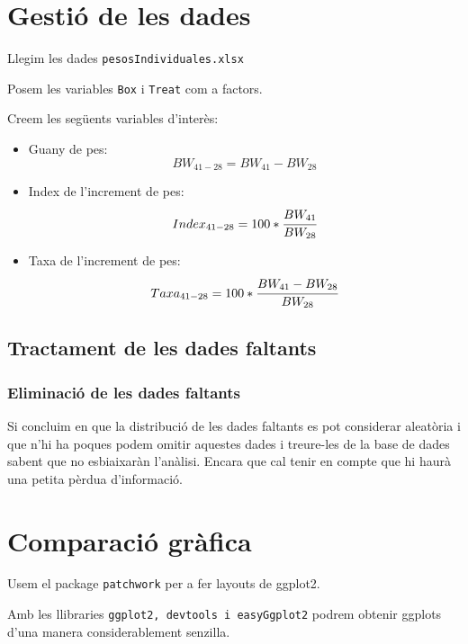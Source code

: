 \documentclass[11pt,a4paper]{article}\usepackage[]{graphicx}\usepackage[]{color}
\begin{document}
\section{Gestió de les dades}
Llegim les dades \texttt{pesosIndividuales.xlsx}





Posem les variables \texttt{Box} i \texttt{Treat} com a factors.



Creem les següents variables d'interès:
\begin{itemize}
\item Guany de pes: 
$$BW_{41-28} = BW_{41} - BW_{28}$$

\item Index de l'increment de pes:
$$Index_{41-28} = 100*\cfrac{BW_{41}}{BW_{28}}$$

\item Taxa de l'increment de pes:
$$Taxa_{41-28} = 100*\cfrac{BW_{41}-BW_{28}}{BW_{28}}$$

\end{itemize}



\subsection{Tractament de les dades faltants}

\subsubsection{Eliminació de les dades faltants}

Si concluim en que la distribució de les dades faltants es pot considerar aleatòria i que n'hi ha poques podem omitir aquestes dades i treure-les de la base de dades sabent que no esbiaixaràn l'anàlisi. Encara que cal tenir en compte que hi haurà una petita pèrdua d'informació.




\section{Comparació gràfica}
Usem el package \texttt{patchwork} per a fer layouts de ggplot2.



Amb les llibraries \texttt{ggplot2, devtools i easyGgplot2} podrem obtenir ggplots d'una manera considerablement senzilla.
\end{document}
